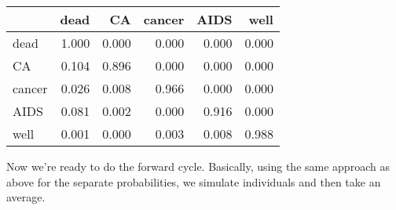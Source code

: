 \documentclass[]{book}
\newenvironment{Shaded}{\begin{snugshade}}{\end{snugshade}}
\newcommand{\ControlFlowTok}[1]{\textcolor[rgb]{0.13,0.29,0.53}{\textbf{#1}}}
\newcommand{\DataTypeTok}[1]{\textcolor[rgb]{0.13,0.29,0.53}{#1}}
\newcommand{\DecValTok}[1]{\textcolor[rgb]{0.00,0.00,0.81}{#1}}
\newcommand{\KeywordTok}[1]{\textcolor[rgb]{0.13,0.29,0.53}{\textbf{#1}}}
\newcommand{\NormalTok}[1]{#1}
\newcommand{\OperatorTok}[1]{\textcolor[rgb]{0.81,0.36,0.00}{\textbf{#1}}}
\newcommand{\OtherTok}[1]{\textcolor[rgb]{0.56,0.35,0.01}{#1}}
\newcommand{\StringTok}[1]{\textcolor[rgb]{0.31,0.60,0.02}{#1}}
\begin{document}
\begin{Shaded}
\end{Shaded}

\begin{tabular}{l|r|r|r|r|r}
\hline
  & dead & CA & cancer & AIDS & well\\
\hline
dead & 1.000 & 0.000 & 0.000 & 0.000 & 0.000\\
\hline
CA & 0.104 & 0.896 & 0.000 & 0.000 & 0.000\\
\hline
cancer & 0.026 & 0.008 & 0.966 & 0.000 & 0.000\\
\hline
AIDS & 0.081 & 0.002 & 0.000 & 0.916 & 0.000\\
\hline
well & 0.001 & 0.000 & 0.003 & 0.008 & 0.988\\
\hline
\end{tabular}

Now we're ready to do the forward cycle.
Basically, using the same approach as above for the separate probabilities, we simulate individuals and then take an average.

\begin{Shaded}
\end{Shaded}
\end{document}
